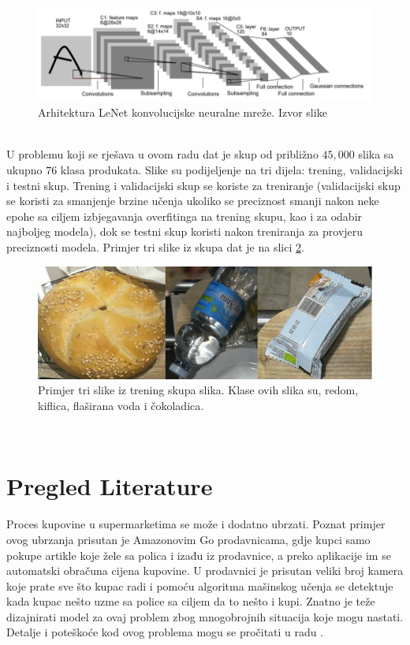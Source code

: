 \documentclass[conference]{IEEEtran}
\begin{document}
\begin{figure}[htbp]
\centerline{\includegraphics[width=\columnwidth]{fig2.png}}
\caption{Arhitektura LeNet \cite{b5} konvolucijske neuralne mreže. Izvor slike \cite{b5}}
\label{fig2}
\end{figure}
\\

U problemu koji se rješava u ovom radu dat je skup od približno $45,000$ slika sa ukupno $76$ klasa produkata. Slike su podijeljenje na tri dijela: trening, validacijski i testni skup. Trening i validacijski skup se koriste za treniranje (validacijski skup se koristi za smanjenje brzine učenja ukoliko se preciznost smanji nakon neke epohe sa ciljem izbjegavanja overfitinga na trening skupu, kao i za odabir najboljeg modela), dok se testni skup koristi nakon treniranja za provjeru preciznosti modela. Primjer tri slike iz skupa dat je na slici \ref{fig3}.

\begin{figure}[htbp]
\centerline{\includegraphics[width=\columnwidth]{fig3.png}}
\caption{Primjer tri slike iz trening skupa slika. Klase ovih slika su, redom, kiflica, flaširana voda i čokoladica.}
\label{fig3}
\end{figure}
\\

\section{Pregled Literature}

Proces kupovine u supermarketima se može i dodatno ubrzati. Poznat primjer ovog ubrzanja prisutan je Amazonovim Go prodavnicama, gdje kupci samo pokupe artikle koje žele sa polica i izađu iz prodavnice, a preko aplikacije im se automatski obračuna cijena kupovine. U prodavnici je prisutan veliki broj kamera koje prate sve što kupac radi i pomoću algoritma mašinskog učenja se detektuje kada kupac nešto uzme sa police sa ciljem da to nešto i kupi. Znatno je teže dizajnirati model za ovaj problem zbog mnogobrojnih situacija koje mogu nastati. Detalje i poteškoće kod ovog problema mogu se pročitati u radu \cite{b7}. 
\end{document}
